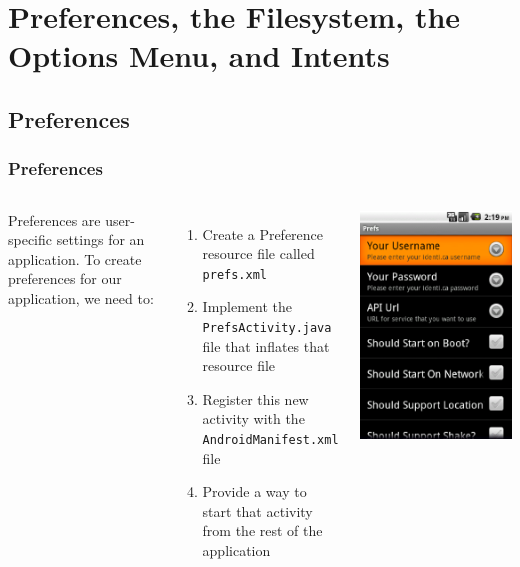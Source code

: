 \section{Preferences, the Filesystem, the Options Menu, and Intents}
\subsection{Preferences}
\begin{frame}
\frametitle{Preferences}
\begin{columns}
Preferences are user-specific settings for an application. To create preferences for our application, we need to:
\begin{enumerate}
\item Create a Preference resource file called \texttt{prefs.xml}
\item Implement the \texttt{PrefsActivity.java} file that inflates that resource file
\item Register this new activity with the \texttt{AndroidManifest.xml} file
\item Provide a way to start that activity from the rest of the application
\end{enumerate}
\includegraphics[width= 0.95 \textwidth]{prefrences.eps}
\end{columns}
\end{frame}
